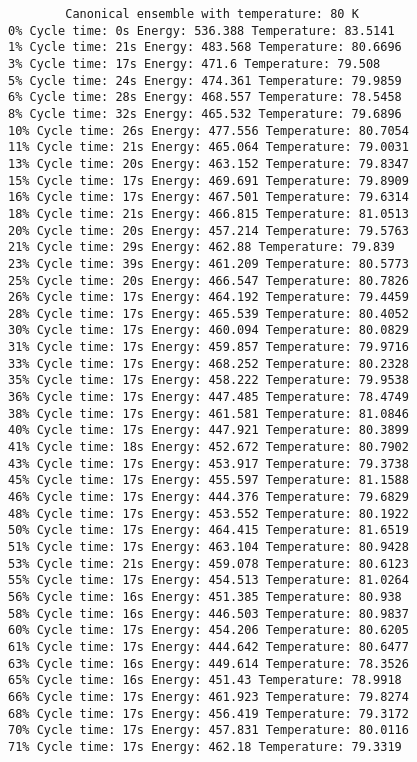 \documentclass{article}
\begin{document}
    \begin{verbatim}
        Canonical ensemble with temperature: 80 K
0% Cycle time: 0s Energy: 536.388 Temperature: 83.5141
1% Cycle time: 21s Energy: 483.568 Temperature: 80.6696
3% Cycle time: 17s Energy: 471.6 Temperature: 79.508
5% Cycle time: 24s Energy: 474.361 Temperature: 79.9859
6% Cycle time: 28s Energy: 468.557 Temperature: 78.5458
8% Cycle time: 32s Energy: 465.532 Temperature: 79.6896
10% Cycle time: 26s Energy: 477.556 Temperature: 80.7054
11% Cycle time: 21s Energy: 465.064 Temperature: 79.0031
13% Cycle time: 20s Energy: 463.152 Temperature: 79.8347
15% Cycle time: 17s Energy: 469.691 Temperature: 79.8909
16% Cycle time: 17s Energy: 467.501 Temperature: 79.6314
18% Cycle time: 21s Energy: 466.815 Temperature: 81.0513
20% Cycle time: 20s Energy: 457.214 Temperature: 79.5763
21% Cycle time: 29s Energy: 462.88 Temperature: 79.839
23% Cycle time: 39s Energy: 461.209 Temperature: 80.5773
25% Cycle time: 20s Energy: 466.547 Temperature: 80.7826
26% Cycle time: 17s Energy: 464.192 Temperature: 79.4459
28% Cycle time: 17s Energy: 465.539 Temperature: 80.4052
30% Cycle time: 17s Energy: 460.094 Temperature: 80.0829
31% Cycle time: 17s Energy: 459.857 Temperature: 79.9716
33% Cycle time: 17s Energy: 468.252 Temperature: 80.2328
35% Cycle time: 17s Energy: 458.222 Temperature: 79.9538
36% Cycle time: 17s Energy: 447.485 Temperature: 78.4749
38% Cycle time: 17s Energy: 461.581 Temperature: 81.0846
40% Cycle time: 17s Energy: 447.921 Temperature: 80.3899
41% Cycle time: 18s Energy: 452.672 Temperature: 80.7902
43% Cycle time: 17s Energy: 453.917 Temperature: 79.3738
45% Cycle time: 17s Energy: 455.597 Temperature: 81.1588
46% Cycle time: 17s Energy: 444.376 Temperature: 79.6829
48% Cycle time: 17s Energy: 453.552 Temperature: 80.1922
50% Cycle time: 17s Energy: 464.415 Temperature: 81.6519
51% Cycle time: 17s Energy: 463.104 Temperature: 80.9428
53% Cycle time: 21s Energy: 459.078 Temperature: 80.6123
55% Cycle time: 17s Energy: 454.513 Temperature: 81.0264
56% Cycle time: 16s Energy: 451.385 Temperature: 80.938
58% Cycle time: 16s Energy: 446.503 Temperature: 80.9837
60% Cycle time: 17s Energy: 454.206 Temperature: 80.6205
61% Cycle time: 17s Energy: 444.642 Temperature: 80.6477
63% Cycle time: 16s Energy: 449.614 Temperature: 78.3526
65% Cycle time: 16s Energy: 451.43 Temperature: 78.9918
66% Cycle time: 17s Energy: 461.923 Temperature: 79.8274
68% Cycle time: 17s Energy: 456.419 Temperature: 79.3172
70% Cycle time: 17s Energy: 457.831 Temperature: 80.0116
71% Cycle time: 17s Energy: 462.18 Temperature: 79.3319

\end{verbatim}
\end{document}
